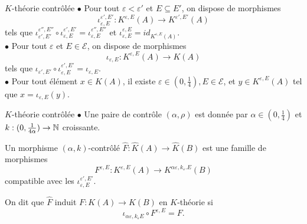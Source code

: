 \begin{frame}{$K$-théorie contrôlée}
$\bullet$ Pour tout $\varepsilon <\varepsilon'$ et $E\subseteq E'$, on dispose de morphismes 
\[\iota_{\varepsilon,E}^{\varepsilon',E'} : K^{\varepsilon,E}(A)\rightarrow K^{\varepsilon',E'}(A) \]
tels que $\iota_{\varepsilon',E'}^{\varepsilon'',E''}\circ \iota_{\varepsilon,E}^{\varepsilon',E'} = \iota_{\varepsilon,E}^{\varepsilon'',E''}$ et $\iota_{\varepsilon,E}^{\varepsilon,E}= id_{K^{\varepsilon,E}(A)}$.\\
\vspace{0.3 cm}
$\bullet$ Pour tout $\varepsilon $ et $E\in\mathcal E$, on dispose de morphismes 
\[\iota_{\varepsilon,E} : K^{\varepsilon,E}(A)\rightarrow K(A) \]
tels que $\iota_{\varepsilon',E'}\circ \iota_{\varepsilon,E}^{\varepsilon',E'} = \iota_{\varepsilon,E}$.\\
\vspace{0.3 cm}
$\bullet$ Pour tout élément $x\in K(A)$, il existe $\varepsilon\in (0,\frac{1}{4}),E\in\mathcal E$, et $y\in K^{\varepsilon,E}(A)$ tel que $x=\iota_{\varepsilon,E}(y)$.
\end{frame}

\begin{frame}{$K$-théorie contrôlée}
$\bullet$ Une paire de contrôle $(\alpha,\rho)$ est donnée par $\alpha\in (0,\frac{1}{4})$ et $k : (0,\frac{1}{4\alpha})\rightarrow \mathbb N $ croissante.
\begin{definitionfr}
Un morphisme $(\alpha,k)$-contrôlé $\hat F : \hat K(A) \rightarrow \hat K(B)$ est une famille de morphismes 
\[F^{\varepsilon,E}: K^{\varepsilon,E}(A) \rightarrow K^{\alpha\varepsilon,k_\varepsilon. E}(B)\] 
compatible avec les $\iota_{\varepsilon,E}^{\varepsilon',E'}$.
\end{definitionfr}
\vspace{0.3 cm}
On dit que $\hat F$ induit $F : K(A)\rightarrow K(B)$ en $K$-théorie si 
\[\iota_{\alpha \varepsilon,k_\varepsilon E}\circ F^{\varepsilon,E}=F.\]
\end{frame}


